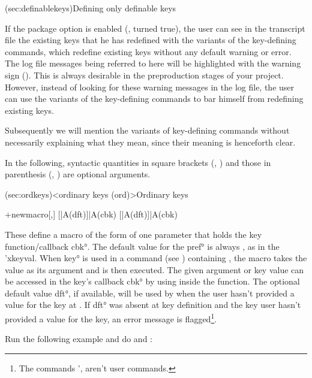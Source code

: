 \documentclass[
  use-a4-paper,
  use-10pt-font,
  final-version,
  use-UK-English,
  fancy-section-headings,
  frame-section-numbers,
  para-abstract-style,
  inputfile,
  input-config-file,
  no-hyperref-messages,
  wrapquote,
]{amltxdoc}
\begin{document}
\begin{syntax}

\docsubsection(sec:definablekeys){Defining only definable keys}

If the package option  is enabled (\ie, turned true), the user can see in the transcript file the existing keys that he has redefined with the \textltxkey variants of the key-defining commands, which redefine existing keys without any default warning or error. The log file messages being referred to here will be highlighted with the warning sign (\makered{!!}). This is always desirable in the preproduction stages of your project. However, instead of looking for these warning messages in the log file, the user can use the \textnewkey variants of the key-defining commands to bar himself from redefining existing keys.

Subsequently we will mention the \textnewkey variants of key-defining commands without necessarily explaining what they mean, since their meaning is henceforth clear.

In the following, syntactic quantities in square brackets (\eg, \fx{[yyy]}) and those in parenthesis (\eg, ) are optional arguments.


\docsubsection(sec:ordkeys)<ordinary keys (ord)>{Ordinary keys}

\start+{newmacro}[\ltxkeysordkey,\ltxkeysnewordkey]
[|A(dft)]{|A(cbk)}
[|A(dft)]{|A(cbk)}
\fxim*{\ltxkeysordkey,\ltxkeysnewordkey}

These define a macro of the form \preffamkey of one parameter that holds the key function/callback \ang{cbk}. The default value for the  \ang{pref} is always , as in the \pkg'{xkeyval}. When \ang{key} is used in a \fx{\ltxkeyssetkeys} command (see ) containing \keyval, the macro \preffamkey takes the value as its argument and is then executed. The given argument or key value can be accessed in the key's callback \ang{cbk} by using  inside the function. The optional default value \ang{dft}, if available, will be used by \preffamkey when the user hasn't provided a value for the key at \fx{\ltxkeyssetkeys}. If \ang{dft} was absent at key definition and the key user hasn't provided a value for the key, an error message is flagged\footnote{The commands \ffx'{\ltxkeys@key, \ltxkeys@newkey} aren't user commands.}.

Run the following example and do \fx{\show\cmdb} and \fx{\show\cmdd}:


\end{syntax}
\end{document}
